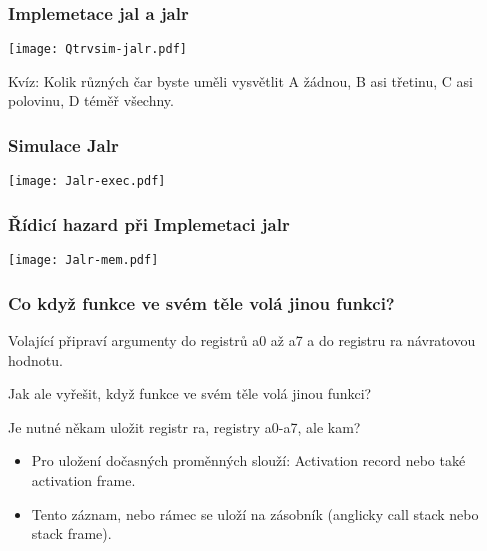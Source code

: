 \documentclass{beamer}
\begin{document}
\begin{frame}
\frametitle{Implemetace jal a jalr}

\begin{center}
\texttt{[image: Qtrvsim-jalr.pdf]}
\end{center}

Kvíz: Kolik různých čar byste uměli vysvětlit A žádnou, B asi třetinu, C asi polovinu, D téměř všechny.
\end{frame}


\begin{frame}
\frametitle{Simulace Jalr}

\begin{center}
\texttt{[image: Jalr-exec.pdf]}
\end{center}

\end{frame}



\begin{frame}
\frametitle{Řídicí hazard při Implemetaci jalr}

\begin{center}
\texttt{[image: Jalr-mem.pdf]}
\end{center}

\end{frame}



\begin{frame}
\frametitle{Co když funkce ve svém těle volá jinou funkci?}

Volající připraví argumenty do registrů a0 až a7 a do registru ra návratovou hodnotu.

\bigskip

Jak ale vyřešit, když funkce ve svém těle volá jinou funkci?

\bigskip

Je nutné někam uložit registr ra, registry a0-a7, ale kam?


\begin{itemize}
 \item Pro uložení dočasných proměnných slouží: Activation record nebo také activation frame. 
 \item Tento záznam, nebo rámec se uloží na zásobník (anglicky call stack nebo stack frame).
\end{itemize}
\end{frame}
\end{document}
